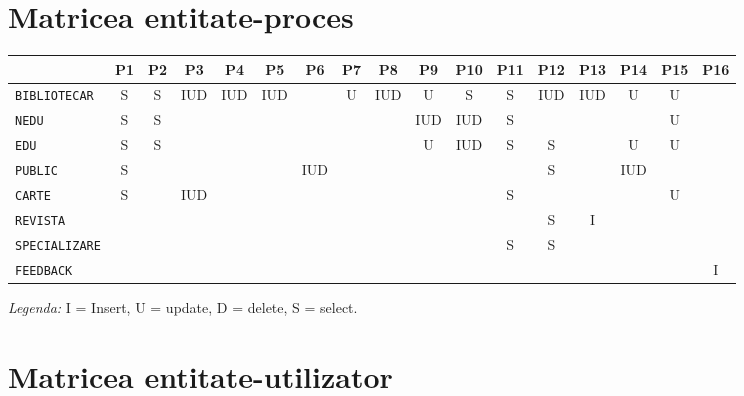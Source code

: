 

\section{Matricea entitate-proces}
\label{sec:matr-ep}

\begin{center}
    \footnotesize
    \begin{tabular}{|l|c|c|c|c|c|c|c|c|c|c|c|c|c|c|c|c|}
        \hline
    & P1 & P2 & P3 & P4 & P5 & P6 & P7 & P8 & P9 & P10 & P11 & P12 & P13 & P14 & P15 & P16 \\
    \hline \hline
        \texttt{BIBLIOTECAR} & S & S & IUD & IUD & IUD & & U & IUD & U & S & S & IUD & IUD & U & U & \\
        \hline
        \texttt{NEDU} & S & S & & & & & & & IUD & IUD & S & & & & U & \\
        \hline
        \texttt{EDU} & S & S & & & & & & & U & IUD & S & S & & U & U & \\
        \hline
        \texttt{PUBLIC} & S & & & & & IUD & & & & & & S & & IUD & & \\
        \hline
        \texttt{CARTE} & S & & IUD & & & & & & & & S & & & & U & \\
        \hline
        \texttt{REVISTA} & & & & & & & & & & & & S & I & & & \\
        \hline
        \texttt{SPECIALIZARE} & & & & & & & & & & & S & S & & & & \\
        \hline
        \texttt{FEEDBACK} & & & & & & & & & & & & & & & & I \\
        \hline
    \end{tabular}
\end{center}

\emph{Legenda:} I = Insert, U = update, D = delete, S = select.


\section{Matricea entitate-utilizator}
\label{sec:matr-eu}

